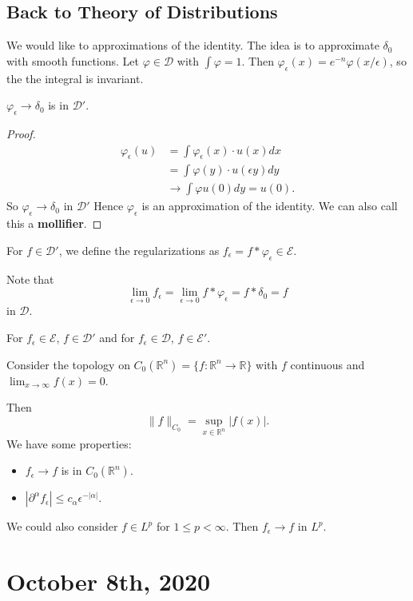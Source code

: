 \documentclass[12pt]{scrartcl}
\newcommand{\R}{\mathbb{R}}
\let \phi \varphi
\begin{document}
\subsection{Back to Theory of Distributions}
We would like to approximations of the identity.  The idea is to approximate $\delta_0$ with smooth functions. Let $\phi \in \mathcal D$ with $\int \phi = 1$.  Then $\phi_\epsilon(x) = e^{-n}\phi(x/\epsilon)$, so the the integral is invariant.
\begin{proposition} $\phi_\epsilon\rightarrow \delta_0$ is in $\mathcal D'$.
\end{proposition}
\begin{proof}
\begin{align*}
\phi_\epsilon(u) &= \int \phi_\epsilon(x) \cdot u(x)dx \\
&= \int \phi(y) \cdot u(\epsilon y) dy \\
&\rightarrow \int \phi u(0) dy = u(0).
\end{align*}
So $\phi_\epsilon \rightarrow \delta_0$ in $\mathcal D'$  Hence $\phi_\epsilon$ is an approximation of the identity.  We can also call this a \textbf{mollifier}.
\end{proof} 
For $f \in \mathcal D'$, we define the regularizations as $f_\epsilon = f * \phi_\epsilon \in \mathcal E$.  

Note that $$\lim_{\epsilon \rightarrow 0} f_\epsilon = \lim_{\epsilon \rightarrow 0} f*\phi_\epsilon = f*\delta_0 = f$$ in $\mathcal D$. 

For $f_{\epsilon} \in \mathcal E$, $f \in \mathcal D'$ and for $f_{\epsilon} \in \mathcal D$, $f \in \mathcal E'$.

\begin{example} Consider the topology on $C_0(\R^n) = \{f : \R^n \rightarrow \R\}$ with $f $ continuous and $\lim_{x \rightarrow \infty} f(x) = 0$. 

Then $$\|f\|_{C_0} = \sup_{x \in \R^n}|f(x)|.$$
We have some properties:
\begin{itemize}
\item $f_\epsilon \rightarrow f$ is in $C_0(\R^n)$.
\item $|\partial^{\alpha} f_\epsilon| \le c_{\alpha}\epsilon^{-|\alpha|}.$
\end{itemize}

We could also consider $f \in L^p$ for $1 \le p < \infty$.  Then $f_{\epsilon} \rightarrow f$ in $L^p$.  
\end{example} 
\pagebreak
\section{October 8th, 2020}
\end{document}
